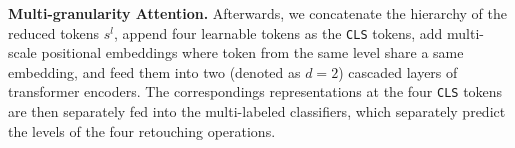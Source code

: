 \documentclass[sigconf]{acmart}
\begin{document}
\noindent\textbf{Multi-granularity Attention.}
Afterwards, we concatenate the hierarchy of the reduced tokens $s^l$, append four learnable tokens as the \texttt{CLS} tokens, add multi-scale positional embeddings where token from the same level share a same embedding, and feed them into two (denoted as $d=2$) cascaded layers of transformer encoders.
The correspondings representations at the four \texttt{CLS} tokens are then separately fed into the multi-labeled classifiers, which separately predict the levels of the four retouching operations.
\end{document}
